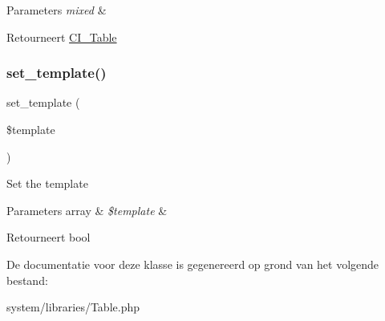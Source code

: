 \begin{DoxyParams}{Parameters}
{\em mixed} & \\
\hline
\end{DoxyParams}
\begin{DoxyReturn}{Retourneert}
\mbox{\hyperlink{class_c_i___table}{C\+I\+\_\+\+Table}} 
\end{DoxyReturn}
\mbox{\label{class_c_i___table_ae65d1ab2a626d4ddfda31befc2b347f6}} 
\subsubsection{\texorpdfstring{set\_template()}{set\_template()}}
{\footnotesize\ttfamily set\+\_\+template (\begin{DoxyParamCaption}\item[{}]{\$template }\end{DoxyParamCaption})}

Set the template


\begin{DoxyParams}[1]{Parameters}
array & {\em \$template} & \\
\hline
\end{DoxyParams}
\begin{DoxyReturn}{Retourneert}
bool 
\end{DoxyReturn}


De documentatie voor deze klasse is gegenereerd op grond van het volgende bestand\+:\begin{DoxyCompactItemize}
\item 
system/libraries/Table.\+php\end{DoxyCompactItemize}
